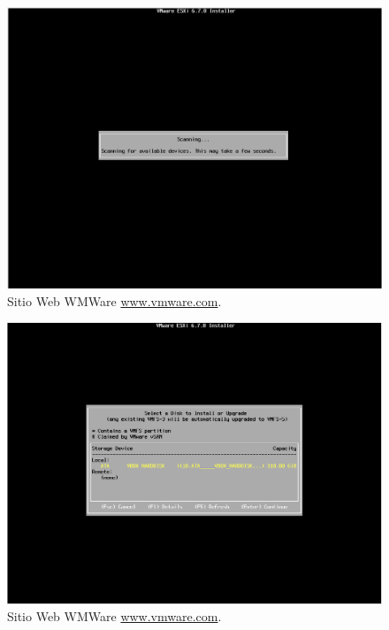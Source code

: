 \begin{figure}[!hbtp]
	\centering
	\includegraphics[width=\linewidth]{RE01_VMwareESXi/RE_VMwareInstalacion07.png}
	\vspace{-0.2cm}
	\caption{Sitio Web WMWare \url{www.vmware.com}.\footnotemark[2]{} }
	\label{fig:VMwareInstalacion07}
\end{figure}


\begin{figure}[!hbtp]
	\centering
	\includegraphics[width=\linewidth]{RE01_VMwareESXi/RE_VMwareInstalacion08.png}
	\vspace{-0.2cm}
	\caption{Sitio Web WMWare \url{www.vmware.com}.\footnotemark[2]{} }
	\label{fig:VMwareInstalacion08}
\end{figure}



